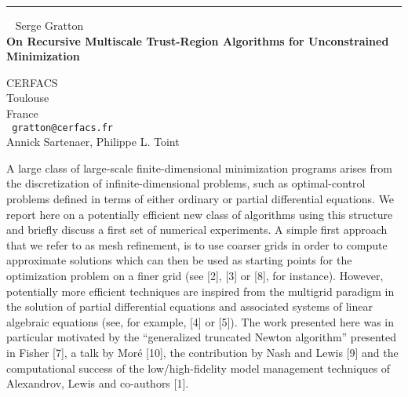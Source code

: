 \documentclass{report}
\begin{document}
\begin{center}

\rule{6in}{1pt} \
{\large
Serge Gratton
\\ {\bf
On Recursive Multiscale Trust-Region Algorithms for Unconstrained
Minimization
}}

CERFACS \\ Toulouse \\ France
\\ {\tt
gratton@cerfacs.fr
}
\\
Annick Sartenaer,  Philippe L. Toint
\end{center}

A large class of large-scale finite-dimensional minimization programs
arises from the discretization of infinite-dimensional problems, such
as optimal-control problems defined in terms of either ordinary or
partial differential equations. We report here on a potentially
efficient new class of algorithms using this structure and briefly
discuss a first set of numerical experiments. A simple first approach
that we refer to as mesh refinement, is to use coarser grids in order
to compute approximate solutions which can then be used as starting
points for the optimization problem on a finer grid (see [2], [3] or
[8], for instance). However, potentially more efficient techniques are
inspired from the multigrid paradigm in the solution of partial
differential equations and associated systems of linear algebraic
equations (see, for example, [4] or [5]). The work presented here was
in particular motivated by the ``generalized truncated Newton
algorithm'' presented in Fisher [7], a talk by Mor\'{e} [10], the
contribution by Nash and Lewis [9] and the computational success of the
low/high-fidelity model management techniques of Alexandrov, Lewis and
co-authors [1].
\end{document}
